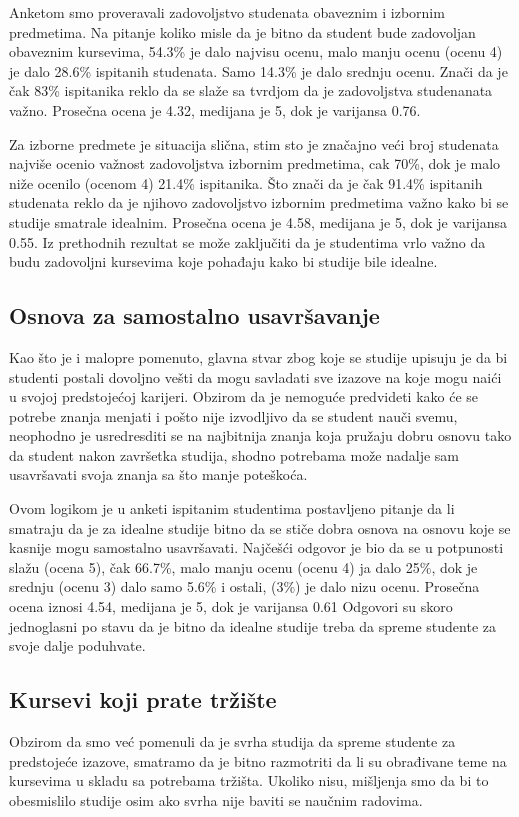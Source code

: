\documentclass[a4paper]{article}
\begin{document}
{Anketom smo proveravali zadovoljstvo studenata obaveznim i izbornim predmetima. Na pitanje koliko misle da je bitno da student bude zadovoljan obaveznim kursevima, 54.3\% je dalo najvisu ocenu, malo manju ocenu (ocenu 4) je dalo 28.6\% ispitanih studenata. Samo  14.3\% je dalo srednju ocenu. Znači da je čak 83\% ispitanika reklo da se slaže sa tvrdjom da je zadovoljstva studenanata važno. Prosečna ocena je 4.32, medijana je 5, dok je varijansa 0.76.

Za izborne predmete je situacija slična, stim sto je značajno veći broj studenata najviše ocenio važnost zadovoljstva izbornim predmetima, cak 70\%, dok je malo niže ocenilo (ocenom 4) 21.4\% ispitanika. Što znači da je čak 91.4\% ispitanih studenata reklo da je njihovo zadovoljstvo izbornim predmetima važno kako bi se studije smatrale idealnim. Prosečna ocena je 4.58, medijana je 5, dok je varijansa 0.55. Iz prethodnih rezultat se može zaključiti da je studentima vrlo važno da budu zadovoljni kursevima koje pohađaju kako bi studije bile idealne.


\subsection{Osnova za samostalno usavršavanje}
\label{subsec:usavršavanje_stavovi}
Kao što je i malopre pomenuto, glavna stvar zbog koje se studije upisuju je da bi studenti postali dovoljno vešti da mogu savladati sve izazove na koje mogu naići u svojoj predstojećoj karijeri. Obzirom da je nemoguće predvideti kako će se potrebe znanja menjati i pošto nije izvodljivo da se student nauči svemu, neophodno je usredresditi se na najbitnija znanja koja pružaju dobru osnovu tako da student nakon završetka studija, shodno potrebama može nadalje sam usavršavati svoja znanja sa što manje poteškoća.

Ovom logikom je u anketi ispitanim studentima postavljeno pitanje da li smatraju da je za idealne studije bitno da se stiče dobra osnova na osnovu koje se kasnije mogu samostalno usavršavati. Najčešći odgovor je bio da se u potpunosti slažu (ocena 5), čak 66.7\%, malo manju ocenu (ocenu 4) ja dalo 25\%, dok je srednju (ocenu 3) dalo samo 5.6\% i ostali, (3\%) je dalo nizu ocenu. Prosečna ocena iznosi 4.54, medijana je 5, dok je varijansa 0.61 Odgovori su skoro jednoglasni po stavu da je bitno da idealne studije treba da spreme studente za svoje dalje poduhvate. 

\subsection{Kursevi koji prate tržište}
\label{subsec:tržište_stavovi}
Obzirom da smo već pomenuli da je svrha studija da spreme studente za predstojeće izazove, smatramo da je bitno razmotriti da li su obrađivane teme na kursevima u skladu sa potrebama tržišta. Ukoliko nisu, mišljenja smo da bi to obesmislilo studije osim ako svrha nije baviti se naučnim radovima.

}
\end{document}

